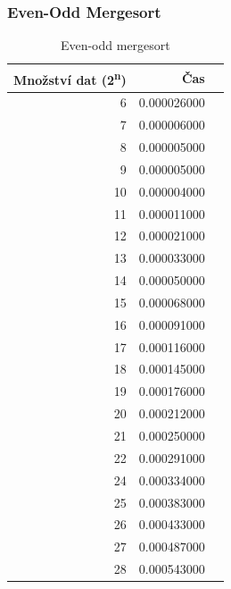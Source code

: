 \documentclass[12pt]{article}
\begin{document}
\subsubsection{Even-Odd Mergesort}
\begin{table}[H]
\begin{center}
\begin{tabular}{|r|r|r|}
\hline Množství dat (2\textsuperscript{n}) & Čas \\ \hline

6  &   0.000026000 \\ \hline
7  &   0.000006000 \\ \hline
8  &   0.000005000 \\ \hline
9  &   0.000005000 \\ \hline
10 &   0.000004000 \\ \hline
11 &   0.000011000 \\ \hline
12 &   0.000021000 \\ \hline
13 &   0.000033000 \\ \hline
14 &   0.000050000 \\ \hline
15 &   0.000068000 \\ \hline
16 &   0.000091000 \\ \hline
17 &   0.000116000 \\ \hline
18 &   0.000145000 \\ \hline
19 &   0.000176000 \\ \hline
20 &   0.000212000 \\ \hline
21 &   0.000250000 \\ \hline
22 &   0.000291000 \\ \hline
24 &   0.000334000 \\ \hline
25 &   0.000383000 \\ \hline
26 &   0.000433000 \\ \hline
27 &   0.000487000 \\ \hline
28 &   0.000543000 \\ \hline
\end{tabular} 
\end{center}
\caption{Even-odd mergesort}
\end{table} 
\end{document}
